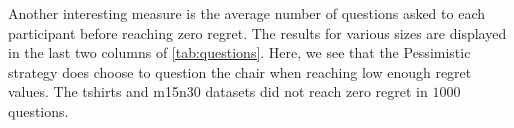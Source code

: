 \documentclass[runningheads]{llncs}
\theoremstyle{remark}
\begin{document}
Another interesting measure is the average number of questions asked to each participant before reaching zero regret. The results for various sizes are displayed in the last two columns of \cref{tab:questions}. Here, we see that the Pessimistic strategy does choose to question the chair when reaching low enough regret values. The tshirts and m15n30 datasets did not reach zero regret in $1000$ questions.

\vspace{-0.6cm}
\end{document}
